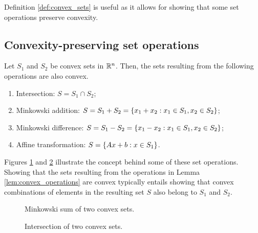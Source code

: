 Definition \ref{def:convex_sets} is useful as it allows for showing that some set operations preserve convexity. 

\subsection{Convexity-preserving set operations}

\begin{lemma} \label{lem:convex_operations}
	Let $S_1$ and $S_2$ be convex sets in $\mathbb{R}^n$. Then, the sets resulting from the following operations are also convex.
	\begin{enumerate}
		\item {Intersection:} $S = S_1 \cap S_2$;
		\item {Minkowski addition:} $S = S_1 + S_2 = \left\{ x_1 + x_2 : x_1 \in S_1, x_2 \in S_2 \right \}$;
		\item {Minkowski\hspace{-1pt} difference:}\hspace{-2pt} $S = S_1 - S_2 = \left\{ x_1 - x_2 : x_1 \in S_1, x_2 \in S_2 \right \}$;
		\item {Affine transformation:} $S = \left\{ Ax + b : x \in S_1 \right \}$.
	\end{enumerate}
\end{lemma}

Figures \ref{fig:mink_sum} and \ref{fig:intersection} illustrate the concept behind some of these set operations. Showing that the sets resulting from the operations in Lemma \ref{lem:convex_operations} are convex typically entails showing that convex combinations of elements in the resulting set $S$ also belong to $S_1$ and $S_2$.

\begin{figure}
	\centering
		\caption{Minkowski sum of two convex sets.}\label{fig:mink_sum}
\end{figure}

%
\begin{figure}
	\centering
    
    \caption{Intersection of two convex sets.} \label{fig:intersection}
\end{figure}
%

